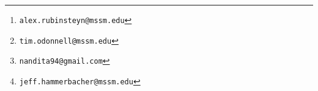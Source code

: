 \usepackage{nips2013,times}


\usepackage[utf8]{inputenc} %
\usepackage[T1]{fontenc}    %
\usepackage{booktabs}       %
\usepackage{amsfonts}       %
\usepackage{nicefrac}       %
\usepackage{microtype}      %


\usepackage[space]{grffile}
\usepackage{natbib}
\usepackage{hyperref}       %
\usepackage{url}            %




\nipsfinalcopy

\author{
Alex Rubinsteyn\thanks{\texttt{alex.rubinsteyn@mssm.edu}} \\
Icahn School of Medicine at Mount Sinai \\
\And
Timothy O'Donnell\thanks{\texttt{tim.odonnell@mssm.edu}} \\
Icahn School of Medicine at Mount Sinai \\
\And
Nandita Damaraju\thanks{\texttt{nandita94@gmail.com}} \\
Georgia Institute of Technology \\
\And
Jeff Hammerbacher\thanks{\texttt{jeff.hammerbacher@mssm.edu}} \\
Icahn School of Medicine at Mount Sinai \\
}